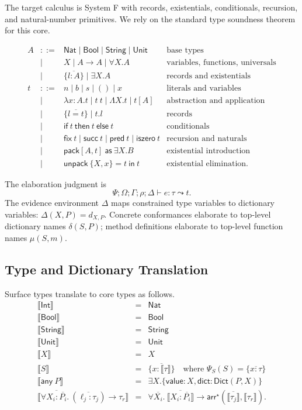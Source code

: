\documentclass[manuscript,nonacm]{acmart}
\newcommand{\kw}[1]{\ensuremath{\mathsf{#1}}}
\newcommand{\Int}{\kw{Int}}
\newcommand{\Bool}{\kw{Bool}}
\newcommand{\String}{\kw{String}}
\newcommand{\Unit}{\kw{Unit}}
\newcommand{\Nat}{\kw{Nat}}
\newcommand{\Any}[1]{\kw{any}\ #1}
\newcommand{\ftype}[3]{\forall #1.\ (#2) \to #3}
\newcommand{\has}{\vdash}
\newcommand{\elab}{\leadsto}
\newcommand{\trans}[1]{\llbracket #1 \rrbracket}
\newcommand{\arrstar}{\mathsf{arr}^{\star}}
\newcommand{\Dict}{\mathsf{Dict}}
\newcommand{\pack}{\kw{pack}}
\newcommand{\unpack}{\kw{unpack}}
\newcommand{\tin}{\kw{in}}
\begin{document}
The target calculus is System F with records, existentials, conditionals, recursion, and natural-number primitives.
We rely on the standard type soundness theorem for this core.

\[
\begin{array}{rcll}
A & ::= & \Nat \mid \Bool \mid \String \mid \Unit
  & \text{base types} \\
& \mid & X \mid A\to A \mid \forall X.A
  & \text{variables, functions, universals} \\
& \mid & \{\overline{l:A}\} \mid \exists X.A
  & \text{records and existentials} \\[1mm]
t & ::= & n \mid b \mid s \mid () \mid x
  & \text{literals and variables} \\
& \mid & \lambda x:A.t \mid t\ t \mid \Lambda X.t \mid t[A]
  & \text{abstraction and application} \\
& \mid & \{\overline{l=t}\} \mid t.l
  & \text{records} \\
& \mid & \kw{if}\ t\ \kw{then}\ t\ \kw{else}\ t
  & \text{conditionals} \\
& \mid & \kw{fix}\ t \mid \kw{succ}\ t \mid \kw{pred}\ t \mid \kw{iszero}\ t
  & \text{recursion and naturals} \\
& \mid & \pack[A,t]\ \kw{as}\ \exists X.B
  & \text{existential introduction} \\
& \mid & \unpack\ \{X,x\}=t\ \tin\ t
  & \text{existential elimination.}
\end{array}
\]

The elaboration judgment is
\[
  \Psi;\Omega;\Gamma;\rho;\Delta \has e:\tau \elab t.
\]
The evidence environment $\Delta$ maps constrained type variables to dictionary variables:
$\Delta(X,P)=d_{X,P}$.
Concrete conformances elaborate to top-level dictionary names $\delta(S,P)$; method definitions elaborate to top-level function names $\mu(S,m)$.

\subsection{Type and Dictionary Translation}

Surface types translate to core types as follows.
\[
\begin{array}{rcl}
\trans{\Int} &=& \Nat \\
\trans{\Bool} &=& \Bool \\
\trans{\String} &=& \String \\
\trans{\Unit} &=& \Unit \\
\trans{X} &=& X \\
\trans{S} &=& \{\overline{x:\trans{\tau}}\}
  \quad\text{where }\Psi_S(S)=\{\overline{x:\tau}\} \\
\trans{\Any{P}} &=&
  \exists X.\{\kw{value}:X,\kw{dict}:\Dict(P,X)\} \\
\trans{\ftype{\overline{X_i:\overline{P_i}}}
              {\overline{\ell_j:\tau_j}}
              {\tau_r}}
  &=&
  \forall\overline{X_i}.\
  \trans{\overline{X_i:\overline{P_i}}}
  \to
  \arrstar(\overline{\trans{\tau_j}},\trans{\tau_r}).
\end{array}
\]
\end{document}
